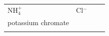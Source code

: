\begin{enumerate}[noitemsep, label=\textbf{\arabic*}. ]
{\begin{center}
\begin{xtabular*}{\mytablewidth}[t]{|p{10\mystarwidth}|p{10\mystarwidth}|p{10\mystarwidth}|p{10\mystarwidth}|}
        \begin{math}\mathrm{NH}_{4}^{+}\end{math} &
    
    
        \begin{math}\mathrm{Cl}{}^{-}\end{math} &
    
    
     \tabularnewline{}
    
    
        potassium chromate &
    
    
         &
    
    
         &
    
    
     \tabularnewline{}
    
    
         &
    

\end{xtabular*}
\end{center}}
\end{enumerate}
